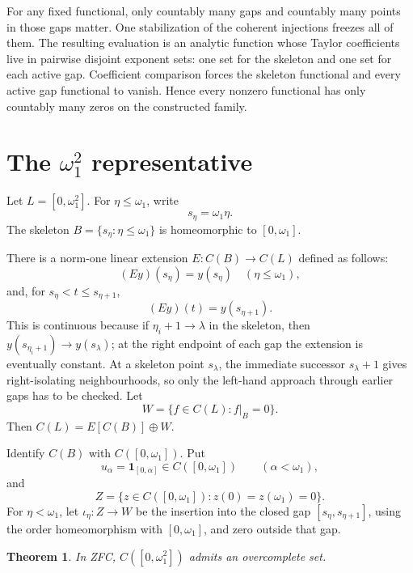 \documentclass[11pt]{article}
\newtheorem{theorem}{Theorem}
\newcommand{\one}{\mathbf 1}
\begin{document}
For any fixed functional, only countably many gaps and countably many points in
those gaps matter.  One stabilization of the coherent injections freezes all
of them.  The resulting evaluation is an analytic function whose Taylor
coefficients live in pairwise disjoint exponent sets: one set for the skeleton
and one set for each active gap.  Coefficient comparison forces the skeleton
functional and every active gap functional to vanish.  Hence every nonzero
functional has only countably many zeros on the constructed family.

\section{The \texorpdfstring{\(\omega_1^2\)}{omega1 squared} representative}

Let \(L=[0,\omega_1^2]\).  For \(\eta\leq\omega_1\), write
\[
   s_\eta=\omega_1\eta.
\]
The skeleton \(B=\{s_\eta:\eta\leq\omega_1\}\) is homeomorphic to
\([0,\omega_1]\).

There is a norm-one linear extension \(E:C(B)\to C(L)\) defined as follows:
\[
   (Ey)(s_\eta)=y(s_\eta)\quad(\eta\leq\omega_1),
\]
and, for \(s_\eta<t\leq s_{\eta+1}\),
\[
   (Ey)(t)=y(s_{\eta+1}).
\]
This is continuous because if \(\eta_i+1\to\lambda\) in the skeleton, then
\(y(s_{\eta_i+1})\to y(s_\lambda)\); at the right endpoint of each gap the
extension is eventually constant.  At a skeleton point \(s_\lambda\), the
immediate successor \(s_\lambda+1\) gives right-isolating neighbourhoods, so
only the left-hand approach through earlier gaps has to be checked.  Let
\[
   W=\{f\in C(L): f|_B=0\}.
\]
Then \(C(L)=E[C(B)]\oplus W\).

Identify \(C(B)\) with \(C([0,\omega_1])\).  Put
\[
   u_\alpha=\one_{[0,\alpha]}\in C([0,\omega_1])\qquad(\alpha<\omega_1),
\]
and
\[
   Z=\{z\in C([0,\omega_1]):z(0)=z(\omega_1)=0\}.
\]
For \(\eta<\omega_1\), let \(\iota_\eta:Z\to W\) be the insertion into the
closed gap \([s_\eta,s_{\eta+1}]\), using the order homeomorphism with
\([0,\omega_1]\), and zero outside that gap.

\begin{theorem}\label{thm:omega1square}
In ZFC, \(C([0,\omega_1^2])\) admits an overcomplete set.
\end{theorem}
\end{document}
